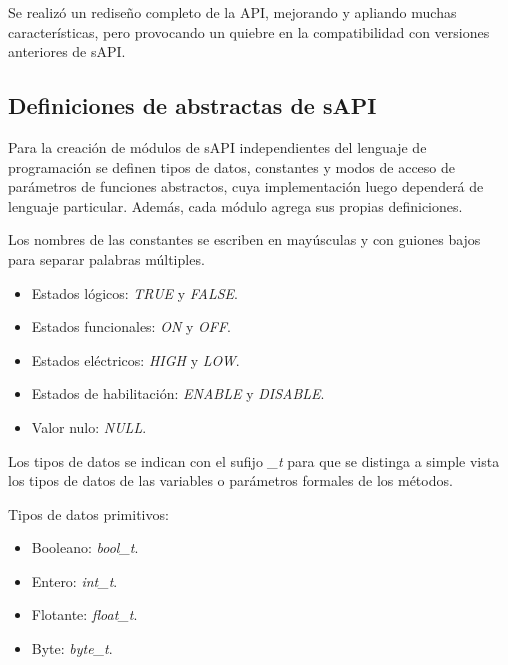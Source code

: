 Se realizó un rediseño completo de la API, mejorando y apliando muchas características, pero provocando un quiebre en la compatibilidad con versiones anteriores de sAPI.

\subsection{Definiciones de abstractas de sAPI}

Para la creación de módulos de sAPI independientes del lenguaje de programación se definen tipos de datos, constantes y modos de acceso de parámetros de funciones abstractos, cuya implementación luego dependerá de lenguaje particular. Además, cada módulo agrega sus propias definiciones.


Los nombres de las constantes se escriben en mayúsculas y con guiones bajos para separar palabras múltiples. 

\begin{itemize}
\item
Estados lógicos: \emph{TRUE} y \emph{FALSE}.
\item
Estados funcionales: \emph{ON} y \emph{OFF}.
\item
Estados eléctricos: \emph{HIGH} y \emph{LOW}.
\item
Estados de habilitación: \emph{ENABLE} y \emph{DISABLE}.
\item
Valor nulo: \emph{NULL}.
\end{itemize}


Los tipos de datos se indican con el sufijo \emph{\_t} para que se distinga a simple vista los tipos de datos de las variables o parámetros formales de los métodos.

Tipos de datos primitivos:

\begin{itemize}
\item
Booleano: \emph{bool\_t}. 
\item
Entero: \emph{int\_t}.
\item
Flotante: \emph{float\_t}.
\item
Byte: \emph{byte\_t}.
\end{itemize}

